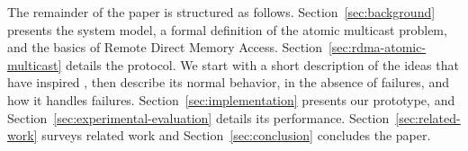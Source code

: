The remainder of the paper is structured as follows.
Section~\ref{sec:background} presents the system model, a formal definition of the atomic multicast problem, and the basics of Remote Direct Memory Access.
Section~\ref{sec:rdma-atomic-multicast} details the \libname protocol.
We start with a short description of the ideas that have inspired \libname, then describe its normal behavior, in the absence of failures, and how it handles failures.
Section~\ref{sec:implementation} presents our prototype, and Section~\ref{sec:experimental-evaluation} details its performance.
Section~\ref{sec:related-work} surveys related work and Section~\ref{sec:conclusion} concludes the paper.

